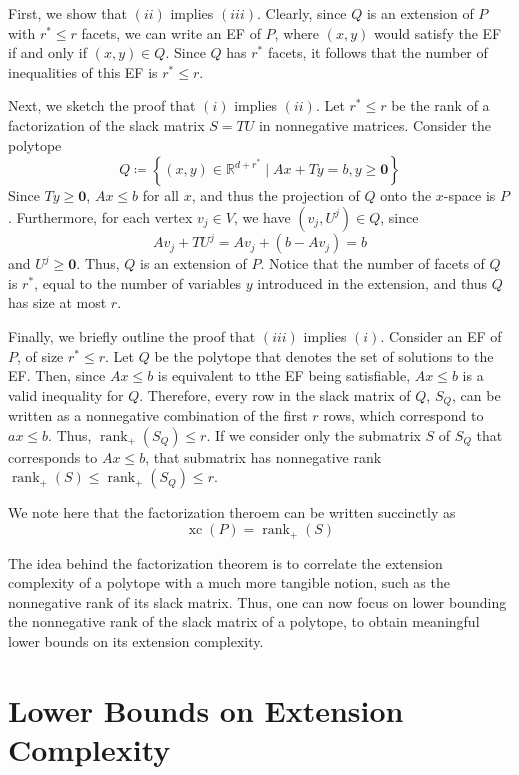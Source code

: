 \documentclass{article}
\theoremstyle{definition}
\theoremstyle{remark}
\newenvironment{proofsketch}{%
  \renewcommand{\proofname}{Proof Sketch}\proof}{\endproof}
\newcommand{\nrank}{\operatorname{rank}_+}
\newcommand{\xc}{\operatorname{xc}}
\renewcommand{\R}{\mathbb{R}}
\begin{document}
\begin{proofsketch}
First, we show that $(ii)$ implies $(iii)$. Clearly, since $Q$ is an extension of $P$ with $r^* \leq r$ facets, we can write an EF of $P$, where $(x, y)$ would satisfy the EF if and only if $(x, y) \in Q$. Since $Q$ has $r^*$ facets, it follows that the number of inequalities of this EF is $r^* \leq r$.

Next, we sketch the proof that $(i)$ implies $(ii)$. Let $r^* \leq r$ be the rank of a factorization of the slack matrix $S = TU$ in nonnegative matrices. Consider the polytope
\[
Q \coloneqq \left\{(x, y) \in \R^{d+r^*} \mid Ax + Ty = b, y \geq \bm{0}\right\}
\]
Since $Ty \geq \bm{0}$, $Ax \leq b$ for all $x$, and thus the projection of $Q$ onto the $x$-space is $P$. Furthermore, for each vertex $v_j \in V$, we have $(v_j, U^j) \in Q$, since
\[
Av_j + TU^j = Av_j + (b - Av_j) = b
\]
and $U^j \geq \bm{0}$. Thus, $Q$ is an extension of $P$. Notice that the number of facets of $Q$ is $r^*$, equal to the number of variables $y$ introduced in the extension, and thus $Q$ has size at most $r$.

Finally, we briefly outline the proof that $(iii)$ implies $(i)$. Consider an EF of $P$, of size $r^* \leq r$. Let $Q$ be the polytope that denotes the set of solutions to the EF. Then, since $Ax \leq b$ is equivalent to tthe EF being satisfiable, $Ax \leq b$ is a valid inequality for $Q$. Therefore, every row in the slack matrix of $Q$, $S_Q$, can be written as a nonnegative combination of the first $r$ rows, which correspond to $ax \leq b$. Thus, $\nrank(S_Q) \leq r$. If we consider only the submatrix $S$ of $S_Q$ that corresponds to $Ax \leq b$, that submatrix has nonnegative rank $\nrank(S) \leq \nrank(S_Q) \leq r$.
\end{proofsketch}

We note here that the factorization theroem can be written succinctly as
\[
\xc(P) = \nrank(S)
\]

The idea behind the factorization theorem is to correlate the extension complexity of a polytope with a much more tangible notion, such as the nonnegative rank of its slack matrix. Thus, one can now focus on lower bounding the nonnegative rank of the slack matrix of a polytope, to obtain meaningful lower bounds on its extension complexity.

\section{Lower Bounds on Extension Complexity}
\end{document}

